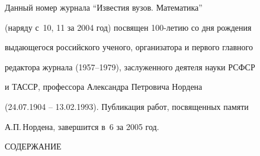 




\newcommand{\tl}[3]{\medskip\noindent{\bf#1}\ #2 \dotfill #3 \par} 


\pagestyle{empty}







\par


\vskip 2cm


\par


\bigskip





Данный номер журнала ``Известия вузов. Математика''


(наряду с \No\No\,10, 11 за 2004 год) посвящен 100-летию со дня рождения


выдающегося российского ученого, организатора и первого главного


редактора журнала (1957--1979), заслуженного деятеля науки РСФСР


и ТАССР, профессора Александра Петровича Нордена


(24.07.1904 -- 13.02.1993). Публикация работ, посвященных памяти


А.П.\,Нордена, завершится в \No\,6 за 2005 год.








\bigskip


\bigskip


\par


\centerline{\Large СОДЕРЖАНИЕ}


\bigskip


\bigskip













